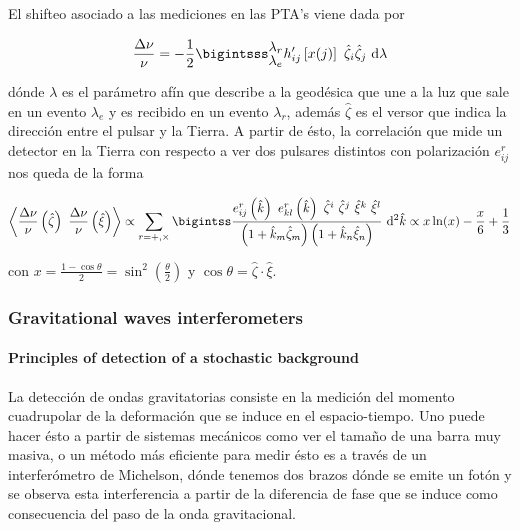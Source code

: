 El shifteo asociado a las mediciones en las PTA's viene dada por

\begin{equation}
    \frac{\Delta \nu}{\nu} = - \frac{1}{2} \bigintsss^{\displaystyle \lambda_r}_{\displaystyle \lambda_e} h'_{ij} \left[ x(j) \right] \ \hat{\zeta}_i \hat{\zeta}_j \ \dd\lambda
\end{equation}

\noindent
dónde $\lambda$ es el parámetro afín que describe a la geodésica que une a la luz que sale en un evento $\lambda_e$ y es recibido en un evento $\lambda_r$, además $\hat{\zeta}$ es el versor que indica la dirección entre el pulsar y la Tierra. A partir de ésto, la correlación que mide un detector en la Tierra con respecto a ver dos pulsares distintos con polarización $e_{ij}^r$ nos queda de la forma

\begin{equation}
    \left\langle \frac{\Delta \nu}{\nu} \left( \hat{\zeta} \right) \ \frac{\Delta \nu}{\nu} \left( \hat{\xi} \right) \right\rangle \propto \sum_{r = +, \times}\bigintss \frac{e^r_{ij} \left( \hat{k} \right) \ e^r_{kl} \left( \hat{k} \right) \ \hat{\zeta}^i \ \hat{\zeta}^j \ \hat{\xi}^k \ \hat{\xi}^l}{\left( 1 + \hat{k}_m \hat{\zeta}_m \right) \left( 1 + \hat{k}_n \hat{\xi}_n \right)} \ \dd^2 \hat{k} \propto x \ln(x) - \frac{x}{6} + \frac{1}{3}
\end{equation}

\noindent
con $\displaystyle x = \frac{1 - \cos \theta}{2} = \sin^2 \left( \frac{\theta}{2} \right)$ y $\cos \theta = \hat{\zeta} \cdot \hat{\xi}$.

\subsubsection{Gravitational waves interferometers}

\paragraph{Principles of detection of a stochastic background}

La detección de ondas gravitatorias consiste en la medición del momento cuadrupolar de la deformación que se induce en el espacio-tiempo. Uno puede hacer ésto a partir de sistemas mecánicos como ver el tamaño de una barra muy masiva, o un método más eficiente para medir ésto es a través de un interferómetro de Michelson, dónde tenemos dos brazos dónde se emite un fotón y se observa esta interferencia a partir de la diferencia de fase que se induce como consecuencia del paso de la onda gravitacional.

